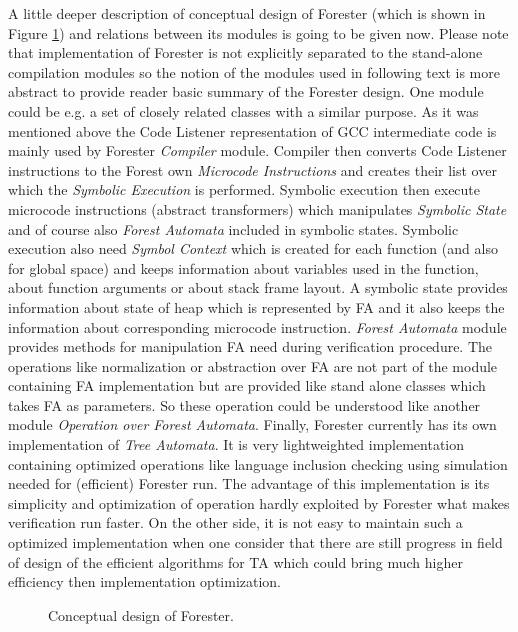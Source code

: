 A little deeper description of conceptual design of Forester (which is shown in Figure \ref{fig:fa_design}) and relations
between its modules is going to be given now.
Please note that implementation of Forester is not explicitly separated to the stand-alone compilation modules so the notion of the modules
used in following text is more abstract to provide reader basic summary of the Forester design.
One module could be e.g. a set of closely related classes with a similar purpose.
As it was mentioned above the Code Listener representation of GCC intermediate code is mainly used by Forester \emph{Compiler} module.
Compiler then converts Code Listener instructions to the Forest own \emph{Microcode Instructions} and creates their list over which the \emph{Symbolic Execution} is performed.
Symbolic execution then execute microcode instructions (abstract transformers) which manipulates \emph{Symbolic State} and of course
also \emph{Forest Automata} included in symbolic states.
Symbolic execution also need \emph{Symbol Context} which is created for each function (and also for global space)
and keeps information about variables used in the function, about function arguments or about stack frame layout.
A symbolic state provides information about state of heap which is represented by FA and it also keeps the information about
corresponding microcode instruction.
\emph{Forest Automata} module provides methods for manipulation FA need during verification procedure.
The operations like normalization or abstraction over FA are not part of the module containing FA implementation but are provided
like stand alone classes which takes FA as parameters.
So these operation could be understood like another module \emph{Operation over Forest Automata}.
Finally, Forester currently has its own implementation of \emph{Tree Automata}.
It is very lightweighted implementation containing optimized operations like language inclusion checking using simulation needed for (efficient) Forester run.
The advantage of this implementation is its simplicity and optimization of operation hardly exploited by Forester what makes verification run faster.
On the other side, it is not easy to maintain such a optimized implementation when one consider that there are still progress in field of design of the efficient algorithms
for TA which could bring much higher efficiency then implementation optimization.
\begin{figure}[bt]
	\begin{center}
		
	\end{center}
	\caption{Conceptual design of Forester.}
	\label{fig:fa_design}
\end{figure}

